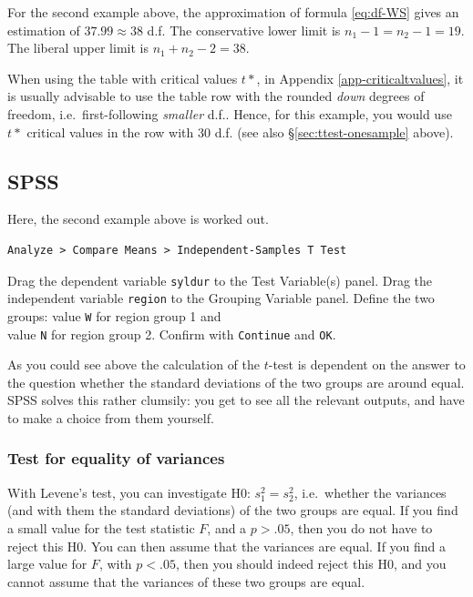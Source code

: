 \documentclass[
]{book}
\begin{document}
For the second example above, the approximation of formula
\eqref{eq:df-WS} gives
an estimation of \(37.99 \approx 38\) d.f. The conservative lower limit is
\(n_1-1 = n_2-1 = 19\). The liberal upper limit is \(n_1+n_2 -2 = 38\).

When using the table with critical values \(t*\), in
Appendix \ref{app-criticaltvalues}, it is usually advisable to use the table row
with the rounded \emph{down} degrees of freedom, i.e.~first-following \emph{smaller} d.f..
Hence, for this example, you would use \(t*\) critical values in the row with \(30\) d.f.
(see also §\ref{sec:ttest-onesample} above).

\hypertarget{sec:SPSS-ttest-unpaired}{%
\subsection{SPSS}\label{sec:SPSS-ttest-unpaired}}

Here, the second example above is worked out.

\begin{verbatim}
Analyze > Compare Means > Independent-Samples T Test
\end{verbatim}

Drag the dependent variable \texttt{syldur} to the Test Variable(s) panel.
Drag the independent variable \texttt{region} to the Grouping
Variable panel. Define the two groups: value \texttt{W} for region group 1 and\\
value \texttt{N} for region group 2. Confirm with \texttt{Continue} and \texttt{OK}.

As you could see above the calculation of the \(t\)-test is dependent on the
answer to the question whether the standard deviations of the two groups
are around equal. SPSS solves this rather clumsily: you get to see all the
relevant outputs, and have to make a choice from them yourself.

\hypertarget{test-for-equality-of-variances}{%
\subsubsection{Test for equality of variances}\label{test-for-equality-of-variances}}

With Levene's test, you can investigate H0: \(s^2_1 = s^2_2\), i.e.~whether
the variances (and with them the standard deviations) of the two groups
are equal. If you find a small value for the test statistic \(F\),
and a \(p>.05\), then you do not have to reject this H0. You can then assume
that the variances are equal. If you find a large value for \(F\),
with \(p<.05\), then you should indeed reject this H0, and you cannot
assume that the variances of these two groups are equal.
\end{document}
